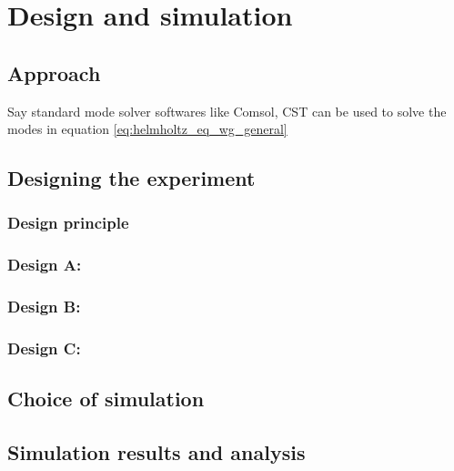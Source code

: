 \documentclass[../report.tex]{subfiles}
\begin{document}
	

\chapter{Design and simulation}
	\section{Approach}
	Say standard mode solver softwares like Comsol, CST \cite{cst_2015} can be used to solve the modes in equation \ref{eq:helmholtz_eq_wg_general}
	\section{Designing the experiment}

		\subsection{Design principle}
	
		\subsection{Design A: }
		
		\subsection{Design B: }
		
		\subsection{Design C: }
	
	\section{Choice of simulation}
	
	\section{Simulation results and analysis}
	
\end{document}
